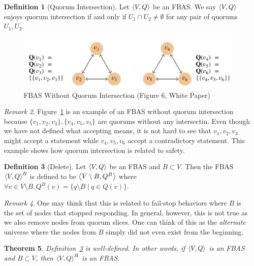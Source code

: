 \documentclass[12pt, psamsfonts]{amsart}
\newtheorem{thm}{Theorem}[subsection]
\theoremstyle{definition}
\newtheorem{defn}[thm]{Definition}
\theoremstyle{remark}
\newtheorem{rem}[thm]{Remark}
\numberwithin{equation}{subsection}
\begin{document}
\begin{defn}[Quorum Intersection]
    Let $\ev{V, Q}$ be an FBAS\@.
    We say $\ev{V, Q}$ enjoys quorum intersection if and only if $U_1 \cap U_2 \ne \emptyset$ for any pair of quorums $U_1, U_2$.
\end{defn}

\begin{figure}[!htb]
    \includegraphics[width=.7\linewidth]{img/quorum_intersection.jpeg}
    \caption{FBAS Without Quorum Intersection (Figure 6, White Paper)}
    \label{fig:fbas_without_quorum_intersection}
\end{figure}

\begin{rem}
    Figure~\ref{fig:fbas_without_quorum_intersection} is an example of an FBAS without quorum intersection because $\{ v_1, v_2, v_3 \}, \{ v_4, v_5, v_5 \}$ are quorums without any intersectin.
    Even though we have not defined what accepting means, it is not hard to see that $v_1, v_2, v_3$ might accept a statement while $v_4, v_5, v_6$ accept a contradictory statement.
    This example shows how quorum intersection is related to safety.
\end{rem}

\begin{defn}[Delete]\label{delete_fbas}
    Let $\ev{V, Q}$ be an FBAS and $B \subset V$.
    Then the FBAS $\ev{V, Q}^B$ is defined to be $\ev{V \setminus B, Q^B}$ where $\forall v \in V \setminus B, Q^B(v) = \{ q \setminus B \mid q \in Q(v) \}$.
\end{defn}

\begin{rem}
    One may think that this is related to fail-stop behaviors where $B$ is the set of nodes that stopped responding.
    In general, however, this is not true as we also remove nodes from quorum slices.
    One can think of this as the \textit{alternate} universe where the nodes from $B$ simply did not even exist from the beginning.
\end{rem}

\begin{thm}
    Definition~\ref{delete_fbas} is well-defined.
    In other words, if $\ev{V, Q}$ is an FBAS and $B \subset V$, then $\ev{V, Q}^B$ is an FBAS\@.
\end{thm}
\end{document}
